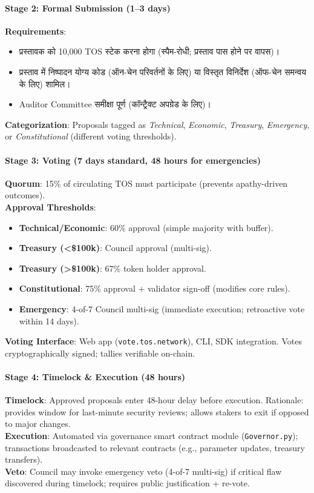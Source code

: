 \documentclass[11pt]{article}
\begin{document}
\begin{itemize}[noitemsep]
\begin{itemize}[noitemsep]
\begin{itemize}[noitemsep]
\begin{itemize}[noitemsep]
\begin{itemize}[noitemsep]
\paragraph{Stage 2: Formal Submission (1--3 days)}
\textbf{Requirements}:
\begin{itemize}[noitemsep]
  \item प्रस्तावक को 10,000 TOS स्टेक करना होगा (स्पैम-रोधी; प्रस्ताव पास होने पर वापस)।
  \item प्रस्ताव में निष्पादन योग्य कोड (ऑन-चेन परिवर्तनों के लिए) या विस्तृत विनिर्देश (ऑफ-चेन समन्वय के लिए) शामिल।
  \item Auditor Committee समीक्षा पूर्ण (कॉन्ट्रैक्ट अपग्रेड के लिए)।
\end{itemize}
\textbf{Categorization}: Proposals tagged as \emph{Technical}, \emph{Economic}, \emph{Treasury}, \emph{Emergency}, or \emph{Constitutional} (different voting thresholds).

\paragraph{Stage 3: Voting (7 days standard, 48 hours for emergencies)}
\textbf{Quorum}: 15\% of circulating TOS must participate (prevents apathy-driven outcomes).\\
\textbf{Approval Thresholds}:
\begin{itemize}[noitemsep]
  \item \textbf{Technical/Economic}: 60\% approval (simple majority with buffer).
  \item \textbf{Treasury (<\$100k)}: Council approval (multi-sig).
  \item \textbf{Treasury (>\$100k)}: 67\% token holder approval.
  \item \textbf{Constitutional}: 75\% approval + validator sign-off (modifies core rules).
  \item \textbf{Emergency}: 4-of-7 Council multi-sig (immediate execution; retroactive vote within 14 days).
\end{itemize}
\textbf{Voting Interface}: Web app (\texttt{vote.tos.network}), CLI, SDK integration. Votes cryptographically signed; tallies verifiable on-chain.

\paragraph{Stage 4: Timelock \& Execution (48 hours)}
\textbf{Timelock}: Approved proposals enter 48-hour delay before execution. Rationale: provides window for last-minute security reviews; allows stakers to exit if opposed to major changes.\\
\textbf{Execution}: Automated via governance smart contract module (\texttt{Governor.py}); transactions broadcasted to relevant contracts (e.g., parameter updates, treasury transfers).\\
\textbf{Veto}: Council may invoke emergency veto (4-of-7 multi-sig) if critical flaw discovered during timelock; requires public justification + re-vote.


\end{itemize}
\end{itemize}
\end{itemize}
\end{itemize}
\end{itemize}
\end{document}
